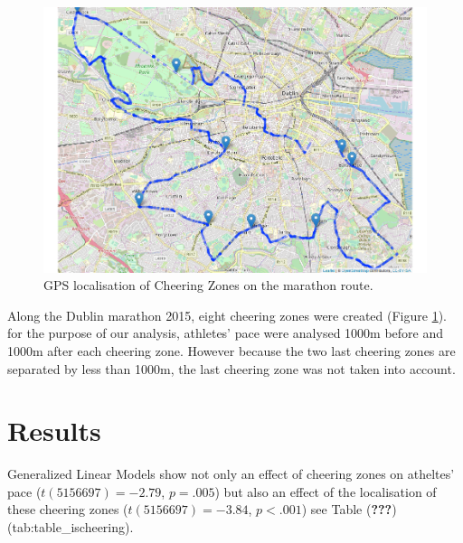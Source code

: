 \documentclass[,man]{apa6}
\theoremstyle{definition}
\theoremstyle{definition}
\theoremstyle{definition}
\theoremstyle{remark}
\begin{document}
\begin{figure}

{\centering \includegraphics{marathon_cheering_effect_files/figure-latex/cheering-zones-map-1} 

}

\caption{GPS localisation of Cheering Zones on the marathon route.}\label{fig:cheering-zones-map}
\end{figure}

Along the Dublin marathon 2015, eight cheering zones were created
(Figure \ref{fig:cheering-zones-map}). for the purpose of our analysis,
athletes' pace were analysed 1000m before and 1000m after each cheering
zone. However because the two last cheering zones are separated by less
than 1000m, the last cheering zone was not taken into account.

\section{Results}\label{results}

Generalized Linear Models show not only an effect of cheering zones on
atheltes' pace (\(t(5156697) = -2.79\), \(p = .005\)) but also an effect
of the localisation of these cheering zones (\(t(5156697) = -3.84\),
\(p < .001\)) see Table ({\textbf{???}})(tab:table\_ischeering).
\end{document}
